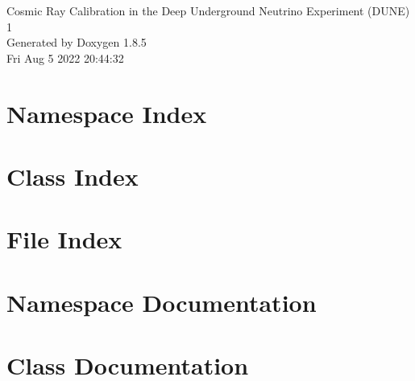 \documentclass[twoside]{book}
\newcommand{\clearemptydoublepage}{%
  \newpage{\pagestyle{empty}\cleardoublepage}%
}
\begin{document}
\hypersetup{pageanchor=false}
\begin{titlepage}
\vspace*{7cm}
\begin{center}%
{\Large Cosmic Ray Calibration in the Deep Underground Neutrino Experiment (D\-U\-N\-E) \\[1ex]\large 1 }\\
\vspace*{1cm}
{\large Generated by Doxygen 1.8.5}\\
\vspace*{0.5cm}
{\small Fri Aug 5 2022 20:44:32}\\
\end{center}
\end{titlepage}
\clearemptydoublepage
\tableofcontents
\clearemptydoublepage
{}
\hypersetup{pageanchor=true}

\chapter{Namespace Index}

\chapter{Class Index}

\chapter{File Index}

\chapter{Namespace Documentation}



\chapter{Class Documentation}





\end{document}
